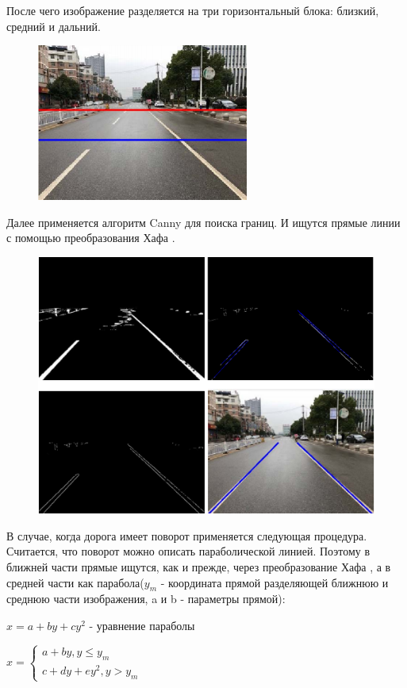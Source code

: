 После чего изображение разделяется на три горизонтальный блока: близкий, средний и дальний.
\begin{figure}[!h]
	\centering
	\includegraphics[width=0.7\linewidth,height=0.4\linewidth]{pictures/screenshot026}
	\caption{}
	\label{fig:screenshot026}
\end{figure}
\newpage
Далее применяется алгоритм Canny\cite{b:canny} для поиска границ. И ищутся прямые линии с помощью преобразования Хафа \cite{b:hough_transform}.
\begin{figure}[h!]
	\centering
	\includegraphics[width=0.7\linewidth]{pictures/screenshot027}
	\caption{}
	\label{fig:screenshot027}
\end{figure}
\newpage
В случае, когда дорога имеет поворот применяется следующая процедура. Считается, что поворот можно описать параболической линией. Поэтому в ближней части прямые ищутся, как и прежде, через преобразование Хафа \cite{b:hough_transform}, а в средней части как парабола($y_m$ - координата прямой разделяющей ближнюю и среднюю части изображения, a и b - параметры прямой):

$x = a + by + cy^2$ - уравнение параболы

$
x =  
\begin{cases}
a + by, y \le y_m 
\\
c + dy + ey^2, y > y_m 
\end{cases}
$

